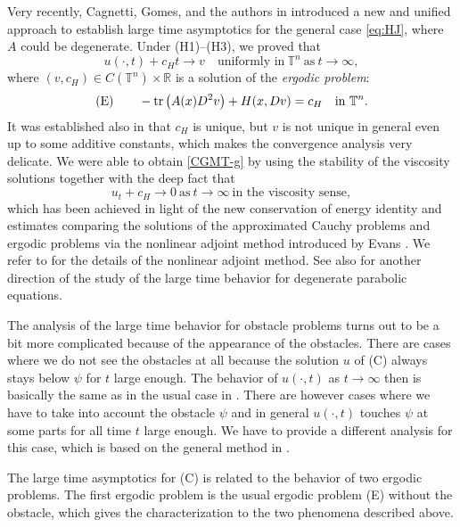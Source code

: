 \documentclass[12pt,reqno]{amsart}
\theoremstyle{plain}
\theoremstyle{remark}
\numberwithin{equation}{section}
\begin{document}
Very recently, Cagnetti, Gomes, and the authors in \cite{CGMT}
introduced a new and unified approach to establish large time asymptotics for the general case \eqref{eq:HJ}, where $A$ could be degenerate. 
Under (H1)--(H3), we proved that
\begin{equation}\label{CGMT-g}
u(\cdot,t)+c_H t \to v \quad  \text{uniformly in} \ {\mathbb{T}}^n \ \text{as} \ t\to\infty ,
\end{equation}
where $(v,c_H)\in C({\mathbb{T}}^n)\times {\mathbb{R}}$ is a solution of the \textit{ergodic problem}: 
\[
{\rm(E)} \qquad
-{{\rm tr}\,}\big(A(x)D^2v\big)+H(x,Dv)=c_H \quad \text{in} \ {\mathbb{T}}^n.   
\]
It was established also in \cite{CGMT} that $c_H$ is unique, but $v$ is not unique
 in general even up to some additive constants,
which makes the convergence analysis very delicate. 
We were able to obtain \eqref{CGMT-g} by using the stability of the viscosity solutions 
together with the deep fact that 
\begin{equation}\label{key:stability}
u_t+c_H \to 0 \ \text{as} \ t \to \infty \ \text{in the viscosity sense}, 
\end{equation}
which has been achieved in light of the new conservation of energy identity
and estimates comparing the solutions of the approximated Cauchy problems and ergodic problems via the nonlinear adjoint method introduced by Evans \cite{Ev1}. 
We refer to \cite{Ev1, T1,CGT1,CGT2} for the details of the nonlinear adjoint method. 
See also \cite{LN} for another direction of the study of the large time behavior for 
degenerate parabolic equations. 
\smallskip

The analysis of the large time behavior for obstacle problems turns out to be a bit more complicated because of the appearance of the obstacles. 
There are cases where we do not see the obstacles at all 
because the solution $u$ of (C) always stays below $\psi$ for $t$ large enough.
The behavior of $u(\cdot,t)$ as $t\to \infty$ then is basically the same as in the usual case in \cite{CGMT}.
There are however cases where we have to take into account the obstacle $\psi$ and in general
$u(\cdot,t)$ touches $\psi$ at some parts for all time $t$ large enough. We have to provide a different analysis
for this case, which is based on the general method in \cite{CGMT}.

The large time asymptotics for (C) is related to the behavior of two ergodic problems. The first ergodic problem is the usual ergodic problem (E) without the obstacle,
which gives the characterization to the two phenomena described above.
 
\end{document}
